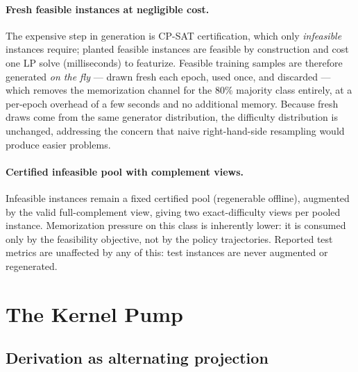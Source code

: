 \documentclass[12pt]{article}
\begin{document}
\paragraph{Fresh feasible instances at negligible cost.} The expensive step in generation is CP-SAT certification, which only \emph{infeasible} instances require; planted feasible instances are feasible by construction and cost one LP solve (milliseconds) to featurize. Feasible training samples are therefore generated \emph{on the fly} --- drawn fresh each epoch, used once, and discarded --- which removes the memorization channel for the 80\% majority class entirely, at a per-epoch overhead of a few seconds and no additional memory. Because fresh draws come from the same generator distribution, the difficulty distribution is unchanged, addressing the concern that naive right-hand-side resampling would produce easier problems.

\paragraph{Certified infeasible pool with complement views.} Infeasible instances remain a fixed certified pool (regenerable offline), augmented by the valid full-complement view, giving two exact-difficulty views per pooled instance. Memorization pressure on this class is inherently lower: it is consumed only by the feasibility objective, not by the policy trajectories. Reported test metrics are unaffected by any of this: test instances are never augmented or regenerated.

\section{The Kernel Pump}
\label{sec:pump}

\subsection{Derivation as alternating projection}
\end{document}
